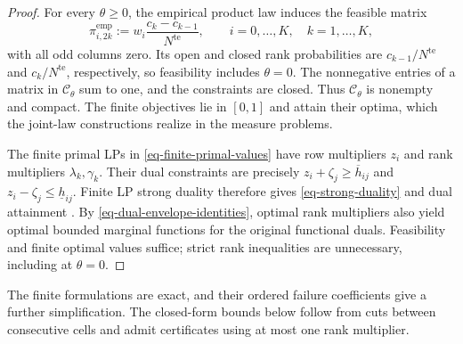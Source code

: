 \documentclass[review,11pt,3p,authoryear,nopreprintline]{elsarticle}
\begin{document}
\begin{proof}
  For every $\theta\ge0$, the empirical product law induces the feasible matrix
  \[
    \pi_{i,2k}^{\mathrm{emp}}:=w_i\frac{c_k-c_{k-1}}{N^{\mathrm{te}}},
    \qquad i=0,\ldots,K,\quad k=1,\ldots,K,
  \]
  with all odd columns zero. Its open and closed rank probabilities are $c_{k-1}/N^{\mathrm{te}}$ and $c_k/N^{\mathrm{te}}$, respectively, so feasibility includes $\theta=0$. The nonnegative entries of a matrix in $\mathcal C_\theta$ sum to one, and the constraints are closed. Thus $\mathcal C_\theta$ is nonempty and compact. The finite objectives lie in $[0,1]$ and attain their optima, which the joint-law constructions realize in the measure problems.

  The finite primal LPs in \eqref{eq-finite-primal-values} have row multipliers $z_i$ and rank multipliers $\lambda_k,\gamma_k$. Their dual constraints are precisely $z_i+\zeta_j\ge\overline h_{ij}$ and $z_i-\zeta_j\le\underline h_{ij}$. Finite LP strong duality therefore gives \eqref{eq-strong-duality} and dual attainment \citep[Section~5.2.3]{B.V04}. By \eqref{eq-dual-envelope-identities}, optimal rank multipliers also yield optimal bounded marginal functions for the original functional duals. Feasibility and finite optimal values suffice; strict rank inequalities are unnecessary, including at $\theta=0$.
\end{proof}

The finite formulations are exact, and their ordered failure coefficients give a further simplification. The closed-form bounds below follow from cuts between consecutive cells and admit certificates using at most one rank multiplier.
\end{document}

